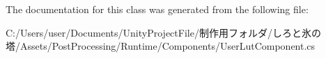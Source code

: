 The documentation for this class was generated from the following file\+:\begin{DoxyCompactItemize}
\item 
C\+:/\+Users/user/\+Documents/\+Unity\+Project\+File/制作用フォルダ/しろと氷の塔/\+Assets/\+Post\+Processing/\+Runtime/\+Components/User\+Lut\+Component.\+cs\end{DoxyCompactItemize}
